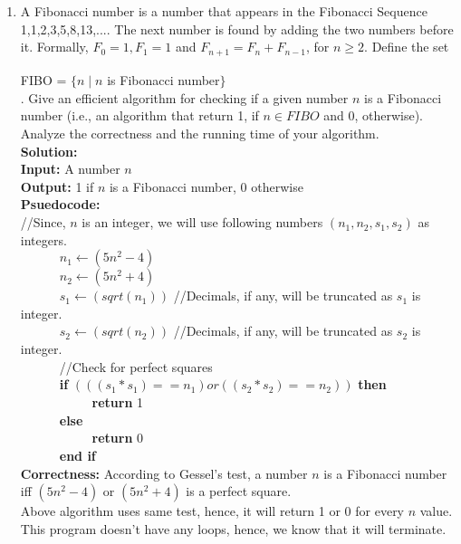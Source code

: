 \documentclass[12pt]{article}
\begin{document}
\begin{enumerate}
\item A Fibonacci number is a number that appears in the Fibonacci Sequence 1,1,2,3,5,8,13,.... The next number is found by adding the two numbers before it. Formally, $F_{0} = 1, F_{1} = 1 $ and $F_{n+1} = F_{n} + F_{n-1}$, for $n \geq 2$. Define the set\\
\verb|		|\verb|		|\verb|		|\verb|		|\verb|		|\verb|		|\verb|		|\verb|		|\verb|		|\verb|		|\verb|		|\verb|		|\verb|		|\verb|		|FIBO = $\{n\; |\; n $ is Fibonacci number$\}$\\
. Give an efficient algorithm for checking if a given number $n$ is a Fibonacci number (i.e., an algorithm that return 1, if $n \in FIBO$ and 0, otherwise). Analyze the correctness and the running time of your algorithm. \\
\textbf{Solution:} \\
\textbf{Input:} A number $n$\\
\textbf{Output:} 1 if $n$ is a Fibonacci number, 0 otherwise\\
\textbf{Psuedocode:} \\
//Since, $n$ is an integer, we will use following numbers $(n_1, n_2, s_1, s_2)$ as integers. \\
\verb|		|$n_1 \leftarrow (5n^2 - 4)$ \\
\verb|		|$n_2 \leftarrow (5n^2 + 4)$\\
\verb|		|$s_1 \leftarrow (sqrt (n_1))$ //Decimals, if any, will be truncated as $s_1$ is integer.\\
\verb|		|$s_2 \leftarrow (sqrt (n_2))$ //Decimals, if any, will be truncated as $s_2$ is integer.\\
\verb|		|//Check for perfect squares\\
\verb|		|\textbf{if} $(((s_1 * s_1) == n_1) or ((s_2 * s_2) == n_2))$  \textbf{then}\\
\verb|		|\verb|		|\textbf{return} 1\\
\verb|		|\textbf{else}\\
\verb|		|\verb|		|\textbf{return} 0\\
\verb|		|\textbf{end if}\\
\textbf{Correctness:} According to Gessel's test, a number $n$ is a Fibonacci number iff $(5n^2-4)$ or $(5n^2+4)$ is a perfect square.\\
Above algorithm uses same test, hence, it will return 1 or 0 for every $n$ value. \\
This program doesn't have any loops, hence, we know that it will terminate.\\

\end{enumerate}
\end{document}
